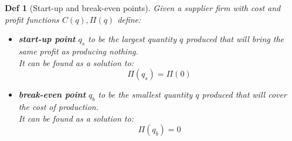 \documentclass[11pt,a4paper, margin]{article}
\theoremstyle{break}
\theoremstyle{break}
\newtheorem*{definition}{Def}
\begin{document}
\begin{definition} [Start-up and break-even points]

Given a supplier firm with cost and profit functions $C(q), \Pi(q)$ define:

\begin{itemize}
	\item \textbf{start-up point} $q_s$ to be the largest quantity $q$ produced that will bring the same profit as producing nothing. \\It can be found as a solution to:
\[\Pi(q_s) = \Pi(0)\]
	\item \textbf{break-even point} $q_b$ to be the smallest quantity $q$ produced that will cover the cost of production. \\It can be found as a solution to:
\[\Pi(q_b) = 0\]
\end{itemize} 

\end{definition}
\end{document}
